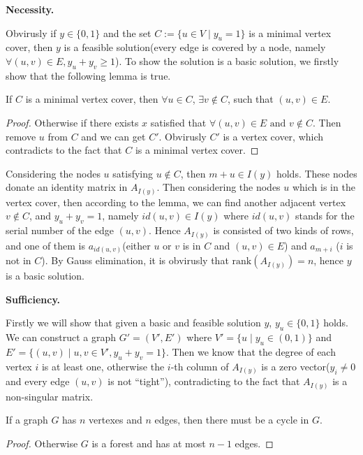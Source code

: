\par\noindent\textbf{Necessity.}\par
Obvirusly if $y \in \{0, 1\}$ and the set $C := \{u \in V \mid y_u = 1\}$ is a minimal vertex cover, then $y$ is a feasible solution(every edge is covered by a node, namely $\forall (u, v) \in E, y_u + y_v \geq 1$). To show the solution is a basic solution, we firstly show that the following lemma is true.
\begin{lemma}
    If $C$ is a minimal vertex cover, then $\forall u \in C$, $\exists v \notin C$, such that $(u, v) \in E$.
\end{lemma}
\begin{proof}
    Otherwise if there exists $x$ satisfied that $\forall (u, v) \in E\text{~and~}v \notin C$. Then remove $u$ from $C$ and we can get $C'$. Obvirusly $C'$ is a vertex cover, which contradicts to the fact that $C$ is a minimal vertex cover.
\end{proof}
\noindent Considering the nodes $u$ satisfying $u \notin C$, then $m + u \in I(y)$ holds. These nodes donate an identity matrix in $A_{I(y)}$. Then considering the nodes $u$ which is in the vertex cover, then according to the lemma, we can find another adjacent vertex $v \notin C$, and $y_u + y_v = 1$, namely $id(u, v) \in I(y)$ where $id(u, v)$ stands for the serial number of the edge $(u, v)$. Hence $A_{I(y)}$ is consisted of two kinds of rows, and one of them is $a_{id(u, v)}$(either $u$ or $v$ is in $C$ and $(u, v) \in E$) and $a_{m+i}$ ($i$ is not in $C$). By Gauss elimination, it is obvirusly that $\mathrm{rank}\left(A_{I(y)}\right) = n$, hence $y$ is a basic solution.
\par\noindent\textbf{Sufficiency.}\par
Firstly we will show that given a basic and feasible solution $y$, $y_u \in \{0, 1\}$ holds. We can construct a graph $G' = (V', E')$ where $V' = \{u\mid y_u \in (0, 1)\}$ and $E' = \{(u, v) \mid u, v \in V', y_u + y_v = 1\}$. Then we know that the degree of each vertex $i$ is at least one, otherwise the $i$-th column of $A_{I(y)}$ is a zero vector($y_i \neq 0$ and every edge $(u, v)$ is not ``tight''), contradicting to the fact that $A_{I(y)}$ is a non-singular matrix.
\begin{lemma}
    If a graph $G$ has $n$ vertexes and $n$ edges, then there must be a cycle in $G$.
\end{lemma}
\begin{proof}
    Otherwise $G$ is a forest and has at most $n - 1$ edges.
\end{proof}
